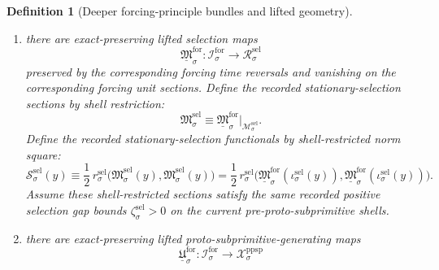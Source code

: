 \documentclass[11pt]{article}
\newcommand{\PreProtoSubprimTarget}[1]{\mathcal X_{#1}^{\mathrm{ppsp}}}
\newcommand{\SelSpace}[1]{\mathcal M_{#1}^{\mathrm{sel}}}
\newcommand{\SelTarget}[1]{\mathcal R_{#1}^{\mathrm{sel}}}
\newcommand{\SelTargetMetric}[1]{r_{#1}^{\mathrm{sel}}}
\newcommand{\SelGap}[1]{\zeta_{#1}^{\mathrm{sel}}}
\newcommand{\SelSection}[1]{\mathfrak M_{#1}^{\mathrm{sel}}}
\newcommand{\SelFunctional}[1]{\mathscr S_{#1}^{\mathrm{sel}}}
\newcommand{\SelInc}[1]{\iota_{#1}^{\mathrm{sel}}}
\newcommand{\ForSpace}[1]{\mathcal I_{#1}^{\mathrm{for}}}
\newcommand{\ForMetric}[1]{I_{#1}^{\mathrm{for}}}
\newcommand{\ForTargetMetric}[1]{j_{#1}^{\mathrm{for}}}
\newcommand{\ForGap}[1]{\alpha_{#1}^{\mathrm{for}}}
\newcommand{\ForSection}[1]{\mathfrak I_{#1}^{\mathrm{for}}}
\newcommand{\ForFunctional}[1]{\mathscr I_{#1}^{\mathrm{for}}}
\newcommand{\ForLiftedSelection}[1]{\underline{\mathfrak M}_{#1}^{\mathrm{for}}}
\newcommand{\ForLiftedPreProto}[1]{\underline{\mathfrak U}_{#1}^{\mathrm{for}}}
\newtheorem{definition}{Definition}
\begin{document}
\begin{definition}[Deeper forcing-principle bundles and lifted geometry]
\begin{enumerate}
\begin{equation}
    \SelSpace{\sigma}\equiv \left(\ForSection{\sigma}\right)^{-1}(0),
    \qquad
    \SelInc{\sigma}:\SelSpace{\sigma}\hookrightarrow \ForSpace{\sigma}.
    \label{eq:selection_shell_from_forcing}
    \end{equation}
    Assume these shells are closed embedded \(C^2\) submanifolds, invariant under the corresponding forcing time reversals, containing the images of the corresponding forcing unit sections, equal to the exact set of global minima of \(\ForFunctional{\sigma}\), and satisfying the positive normal forcing gap bound
    \begin{equation}
    \ForTargetMetric{\sigma}\!\left(
    D\ForSection{\sigma}(z)\xi,
    D\ForSection{\sigma}(z)\xi
    \right)
    \ge
    \ForGap{\sigma}\,
    \ForMetric{\sigma}(\xi,\xi),
    \qquad
    \ForGap{\sigma}>0,
    \label{eq:forcing_gap}
    \end{equation}
    for all \(z\in\SelSpace{\sigma}\) and all \(\xi\) orthogonal, with respect to \(\ForMetric{\sigma}\), to \(T_z\SelSpace{\sigma}\).
    \item there are exact-preserving lifted selection maps
    \[
    \ForLiftedSelection{\sigma}:\ForSpace{\sigma}\to\SelTarget{\sigma}
    \]
    preserved by the corresponding forcing time reversals and vanishing on the corresponding forcing unit sections. Define the recorded stationary-selection sections by shell restriction:
    \begin{equation}
    \SelSection{\sigma}\equiv \ForLiftedSelection{\sigma}|_{\SelSpace{\sigma}}.
    \label{eq:selection_section_from_forcing}
    \end{equation}
    Define the recorded stationary-selection functionals by shell-restricted norm square:
    \begin{equation}
    \SelFunctional{\sigma}(y)
    \equiv
    \frac12\,\SelTargetMetric{\sigma}\bigl(\SelSection{\sigma}(y),\SelSection{\sigma}(y)\bigr)
    =
    \frac12\,\SelTargetMetric{\sigma}\bigl(\ForLiftedSelection{\sigma}(\SelInc{\sigma}(y)),\ForLiftedSelection{\sigma}(\SelInc{\sigma}(y))\bigr).
    \label{eq:selection_functional_from_forcing}
    \end{equation}
    Assume these shell-restricted sections satisfy the same recorded positive selection gap bounds \(\SelGap{\sigma}>0\) on the current pre-proto-subprimitive shells.
    \item there are exact-preserving lifted proto-subprimitive-generating maps
    \[
    \ForLiftedPreProto{\sigma}:\ForSpace{\sigma}\to\PreProtoSubprimTarget{\sigma}
\]
\end{enumerate}
\end{definition}
\end{document}
